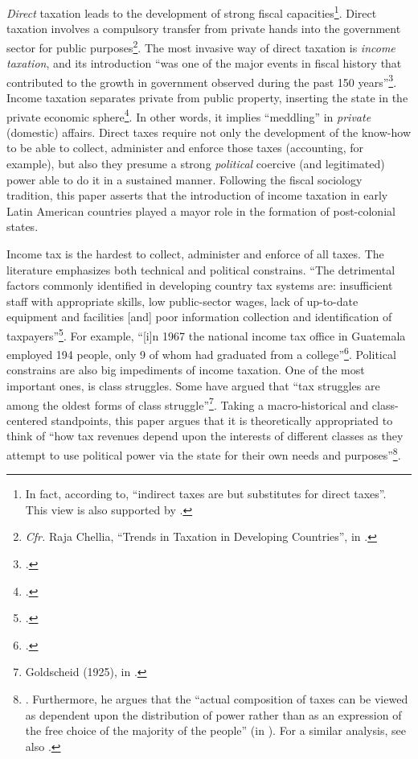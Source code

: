 \documentclass[onesided]{article}\usepackage[]{graphicx}\usepackage[]{color}
\begin{document}
\emph{Direct} taxation leads to the development of strong fiscal capacities\footnote{
	In fact, according to,  \citet[p. 53]{Best1976} ``indirect taxes are but substitutes for direct taxes''. This view is also supported by \citet[p. 14]{Moore2004}.
	}. Direct taxation involves a compulsory transfer from private hands into the government sector for public purposes\footnote{\emph{Cfr.} Raja Chellia, ``Trends in Taxation in Developing Countries'', in \citet[p. 282]{Migdal:1988nr}.}. The most invasive way of direct taxation is \emph{income taxation}, and its introduction ``was one of the major events in fiscal history that contributed to the growth in government observed during the past 150 years''\footnote{\citet[p. 171]{Aidt2009a}.}. Income taxation separates private from public property, inserting the state in the private economic sphere\footnote{\citet[p. 98]{Musgrave1992}.}. In other words, it implies ``meddling'' in \emph{private} (domestic) affairs. Direct taxes require not only the development of the know-how to be able to collect, administer and enforce those taxes (accounting, for example), but also they presume a strong \emph{political} coercive (and legitimated) power able to do it in a sustained manner. Following the fiscal sociology tradition, this paper asserts that the introduction of income taxation in early Latin American countries played a mayor role in the formation of post-colonial states. 

Income tax is the hardest to collect, administer and enforce of all taxes. The literature emphasizes both technical and political constrains. ``The detrimental factors commonly identified in developing country tax systems are: insufficient staff with appropriate skills, low public-sector wages, lack of up-to-date equipment and facilities [and] poor information collection and identification of taxpayers''\footnote{\citet[p. 5]{DiJohn2006}.}. For example, ``[i]n 1967 the national income tax office in Guatemala employed 194 people, only 9 of whom had graduated from  a college''\footnote{\citet[p. 5]{DiJohn2006}.}. Political constrains are also big impediments of income taxation. One of the most important ones, is class struggles. Some have argued that ``tax struggles are among the oldest forms of class struggle''\footnote{Goldscheid (1925), in \citet[p. 168]{Campbell1993}.}. Taking a macro-historical and class-centered standpoints, this paper argues that it is theoretically appropriated to think of ``how tax revenues depend upon the interests of different classes as they attempt to use political power via the state for their own needs and purposes''\footnote{
	\citet[p. 50]{Best1976}. Furthermore, he argues that the ``actual composition of taxes can be viewed as dependent upon the distribution of power rather than as an expression of the free choice of the majority of the people'' (in \citet[p. 71]{Best1976}). For a similar analysis, see also \citet[p. 169]{Campbell1993}.
	}.
\end{document}
